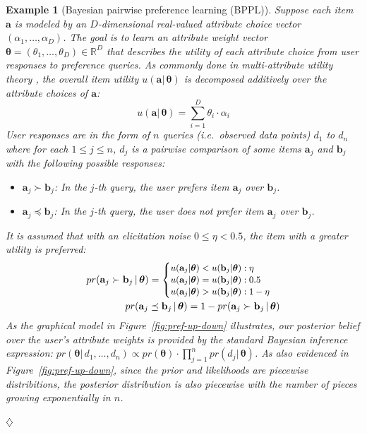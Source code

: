 \documentclass[letterpaper]{article}
\newcommand{\denselist}{\itemsep 0pt\partopsep 0pt}
\newtheorem{example}{Example}
\def\fexample#1#2#3{\vspace{0ex}\begin{example}[#2]\label{#1}\rm #3
\hspace*{\fill} $\diamondsuit$ \end{example}\vspace{0ex} }
\newcommand{\bvec}[1]{\textbf{#1}}
\begin{document}
\fexample{example:pref}{Bayesian pairwise preference learning (BPPL)}{
  Suppose each \emph{item} $\bvec{a}$ is modeled by an $D$-dimensional
  real-valued \emph{attribute choice vector} $(\alpha_1, \ldots,
  \alpha_D)$.  The goal is to learn an \emph{attribute weight vector}
  $\boldsymbol\theta = (\theta_1, \ldots, \theta_D) \in \mathbb{R}^D$
  that describes the utility of each attribute choice from user
  responses to preference queries.  As commonly done in
  \emph{multi-attribute utility theory} \cite{Keeney:93}, the overall
  item utility $u(\bvec{a}|\, \boldsymbol\theta)$ is decomposed 
  additively over the attribute choices of $\bvec{a}$:
%
$$
u(\bvec{a} | \, \boldsymbol\theta) = \sum_{i=1}^D \theta_i\cdot\alpha_i
$$
%
User responses are in the form of $n$ queries (i.e.\ observed data
points) $d_1$ to $d_n$ where for each $1\leq j \leq n$, $d_j$ is a pairwise comparison of some
items $\bvec{a}_j$ and $\bvec{b}_j$ with the following possible
responses:
\begin{itemize}\denselist
\item {\small $\bvec{a}_j \succ \bvec{b}_j$}:  In the $j$-th query, the user prefers item {\small$\bvec{a}_j$} over {\small$\bvec{b}_j$}.
\item {\small $\bvec{a}_j \preceq \bvec{b}_j$}:  In the $j$-th query, the user does not prefer item {\small $\bvec{a}_j$} over {\small$\bvec{b}_j$}.
\end{itemize}
It is assumed that with an \emph{elicitation noise} $0 \leq \eta <
0.5$, the item with a greater utility is preferred:
\begin{align}
\label{e:pref1likelihood}
pr(\bvec{a}_j \succ \bvec{b}_j \,|\, \boldsymbol\theta) =
{\footnotesize
\begin{cases}
u(\bvec{a}_j|\boldsymbol\theta) < u(\bvec{b}_j|\boldsymbol\theta) : \eta\\
u(\bvec{a}_j|\boldsymbol\theta) = u(\bvec{b}_j|\boldsymbol\theta) : 0.5\\
u(\bvec{a}_j|\boldsymbol\theta) > u(\bvec{b}_j|\boldsymbol\theta) : 1-\eta
\end{cases}
}%
\\
pr(\bvec{a}_j \preceq \bvec{b}_j \,|\, \boldsymbol\theta) = 
1 - pr(\bvec{a}_j \succ \bvec{b}_j \,|\, \boldsymbol\theta)
\end{align}
As the graphical model in Figure~\ref{fig:pref-up-down} illustrates, our posterior
belief over the user's attribute weights is provided by the standard
Bayesian inference expression:
$
pr(\boldsymbol\theta | \, d_1, \ldots, d_n) 
\propto pr(\boldsymbol\theta) \cdot \prod_{j=1}^{n} pr(d_j | \, \boldsymbol\theta)
$. As also evidenced in Figure~\ref{fig:pref-up-down}, since the
prior and likelihoods are piecewise distribitions, the posterior
distribution is also piecewise with the number of pieces growing exponentially
in $n$.  
} %
\end{document}
